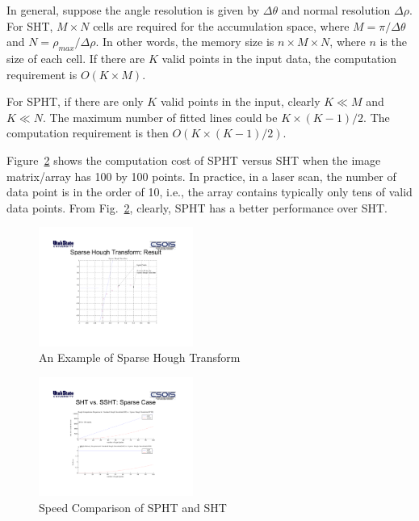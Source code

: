 \documentclass{cdcarta4}
\begin{document}
In general, suppose the  angle resolution is given by $\Delta\theta$ and normal resolution   $\Delta\rho$. For SHT,   $M\times N$ cells are required for the accumulation space, where $ M = \pi/\Delta\theta $ and  
$    N=\rho_{max}/\Delta\rho.  $
In other words, the   memory size is $n\times M\times N$, where $n$ is the size of each cell.
If there are $K$ valid points in the input data, the computation requirement is $O(K\times M)$.

For SPHT, if there are only $K$ valid points in the input, clearly $K\ll M$ and $ K \ll N$. The maximum number of fitted lines could be $ K\times (K-1)/2$. The computation requirement is then $O(K\times (K-1)/2) $. 

Figure~\ref{fig:sphtspeed} shows the computation cost of SPHT versus SHT when the image matrix/array has 100 by 100 points. In practice, in a  laser scan, the number of data point is  in the order of 10, i.e., the array  contains typically   only tens of valid data points.  From Fig.~\ref{fig:sphtspeed}, clearly, SPHT has a better performance  over SHT.


\begin{figure}
    \centering
    \includegraphics[angle=90,width=0.45\textwidth]{img/sparsehough}
    \caption{An Example of Sparse Hough Transform} \label{fig:spht}
\end{figure}

\begin{figure}
    \centering
    \includegraphics[angle=90,width=0.45\textwidth]{img/SSHTSpeed}
    \caption{Speed Comparison of SPHT and SHT} \label{fig:sphtspeed}
\end{figure}
\end{document}
